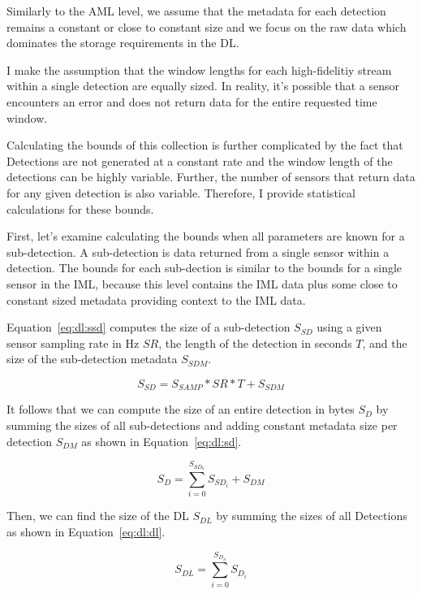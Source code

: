 Similarly to the AML level, we assume that the metadata for each detection remains a constant or close to constant size and we focus on the raw data which dominates the storage requirements in the DL.

I make the assumption that the window lengths for each high-fidelitiy stream within a single detection are equally sized. In reality, it's possible that a sensor encounters an error and does not return data for the entire requested time window.

Calculating the bounds of this collection is further complicated by the fact that Detections are not generated at a constant rate and the window length of the detections can be highly variable. Further, the number of sensors that return data for any given detection is also variable. Therefore, I provide statistical calculations for these bounds.

First, let's examine calculating the bounds when all parameters are known for a sub-detection. A sub-detection is data returned from a single sensor within a detection. The bounds for each sub-dection is similar to the bounds for a single sensor in the IML, because this level contains the IML data plus some close to constant sized metadata providing context to the IML data.

Equation~\ref{eq:dl:ssd} computes the size of a sub-detection $S_{SD}$ using a given sensor sampling rate in Hz $SR$, the length of the detection in seconds $T$, and the size of the sub-detection metadata $S_{SDM}$.

\begin{equation}\label{eq:dl:ssd}
	S_{SD} = S_{SAMP} * SR * T + S_{SDM}
\end{equation}

It follows that we can compute the size of an entire detection in bytes $S_{D}$ by summing the sizes of all sub-detections and adding constant metadata size per detection $S_{DM}$ as shown in Equation~\ref{eq:dl:sd}.

\begin{equation}\label{eq:dl:sd}
	S_{D} = \sum_{i=0}^{S_{SD_{n}}} S_{SD_{i}} + S_{DM}
\end{equation}

Then, we can find the size of the DL $S_{DL}$ by summing the sizes of all Detections as shown in Equation~\ref{eq:dl:dl}.

\begin{equation}\label{eq:dl:dl}
	S_{DL} = \sum_{i=0}^{S_{D_{n}}} S_{D_{i}}
\end{equation}

